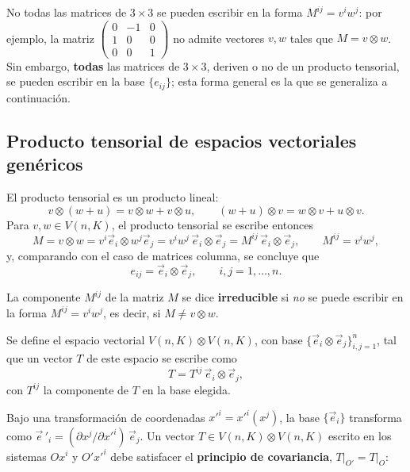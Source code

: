\begin{observacion}
No todas las matrices de $3\times 3$ se pueden escribir en la forma
$M^{ij}=v^iw^j$: por ejemplo, la matriz
$\begin{pmatrix} 0 & -1 & 0 \\ 1 & 0 & 0 \\ 0 & 0 & 1\end{pmatrix}$
no admite vectores $v,w$ tales que $M=v\otimes w$. Sin embargo,
\textbf{todas} las matrices de $3\times3$, deriven o no de un producto
tensorial, se pueden escribir en la base $\{e_{ij}\}$; esta forma general
es la que se generaliza a continuación.
\end{observacion}

\subsection{Producto tensorial de espacios vectoriales genéricos}

El producto tensorial es un producto lineal:
\[
v\otimes(w+u) = v\otimes w + v\otimes u, \qquad (w+u)\otimes v = w\otimes
v + u\otimes v .
\]
Para $v,w\in V(n,K)$, el producto tensorial se escribe entonces
\[
M = v\otimes w = v^i\vec e_i \otimes w^j\vec e_j = v^iw^j\, \vec
e_i\otimes\vec e_j = M^{ij}\, \vec e_i\otimes\vec e_j, \qquad M^{ij}=
v^iw^j,
\]
y, comparando con el caso de matrices columna, se concluye que
\[
e_{ij} = \vec e_i \otimes \vec e_j, \qquad i,j=1,\dots,n.
\]

\begin{definicion}
La componente $M^{ij}$ de la matriz $M$ se dice \textbf{irreducible} si
\emph{no} se puede escribir en la forma $M^{ij}=v^iw^j$, es decir, si
$M \neq v\otimes w$.
\end{definicion}

\begin{definicion}
Se define el espacio vectorial $V(n,K)\otimes V(n,K)$, con base
$\{\vec e_i\otimes\vec e_j\}_{i,j=1}^n$, tal que un vector $T$ de este
espacio se escribe como
\[
T = T^{ij}\, \vec e_i \otimes \vec e_j ,
\]
con $T^{ij}$ la componente de $T$ en la base elegida.
\end{definicion}

Bajo una transformación de coordenadas $x'^i=x'^i(x^j)$, la base
$\{\vec e_i\}$ transforma como $\vec e\,'_i = (\partial x^j/\partial
x'^i)\, \vec e_j$. Un vector $T\in V(n,K)\otimes V(n,K)$ escrito en los
sistemas $Ox^i$ y $O'x'^i$ debe satisfacer el \textbf{principio de
covariancia}, $T\big|_{O'}=T\big|_O$:

